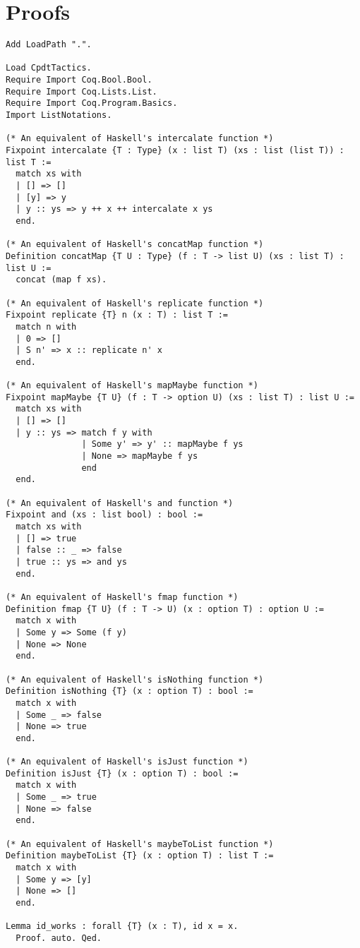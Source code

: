 \chapter{Proofs}
\label{app:proofs}

\begin{verbatim}
Add LoadPath ".".

Load CpdtTactics.
Require Import Coq.Bool.Bool.
Require Import Coq.Lists.List.
Require Import Coq.Program.Basics.
Import ListNotations.

(* An equivalent of Haskell's intercalate function *)
Fixpoint intercalate {T : Type} (x : list T) (xs : list (list T)) : list T :=
  match xs with
  | [] => []
  | [y] => y
  | y :: ys => y ++ x ++ intercalate x ys
  end.

(* An equivalent of Haskell's concatMap function *)
Definition concatMap {T U : Type} (f : T -> list U) (xs : list T) : list U :=
  concat (map f xs).

(* An equivalent of Haskell's replicate function *)
Fixpoint replicate {T} n (x : T) : list T :=
  match n with
  | 0 => []
  | S n' => x :: replicate n' x
  end.

(* An equivalent of Haskell's mapMaybe function *)
Fixpoint mapMaybe {T U} (f : T -> option U) (xs : list T) : list U :=
  match xs with
  | [] => []
  | y :: ys => match f y with
               | Some y' => y' :: mapMaybe f ys
               | None => mapMaybe f ys
               end
  end.

(* An equivalent of Haskell's and function *)
Fixpoint and (xs : list bool) : bool :=
  match xs with
  | [] => true
  | false :: _ => false
  | true :: ys => and ys
  end.

(* An equivalent of Haskell's fmap function *)
Definition fmap {T U} (f : T -> U) (x : option T) : option U :=
  match x with
  | Some y => Some (f y)
  | None => None
  end.

(* An equivalent of Haskell's isNothing function *)
Definition isNothing {T} (x : option T) : bool :=
  match x with
  | Some _ => false
  | None => true
  end.

(* An equivalent of Haskell's isJust function *)
Definition isJust {T} (x : option T) : bool :=
  match x with
  | Some _ => true
  | None => false
  end.

(* An equivalent of Haskell's maybeToList function *)
Definition maybeToList {T} (x : option T) : list T :=
  match x with
  | Some y => [y]
  | None => []
  end.

Lemma id_works : forall {T} (x : T), id x = x.
  Proof. auto. Qed.


\end{verbatim}
